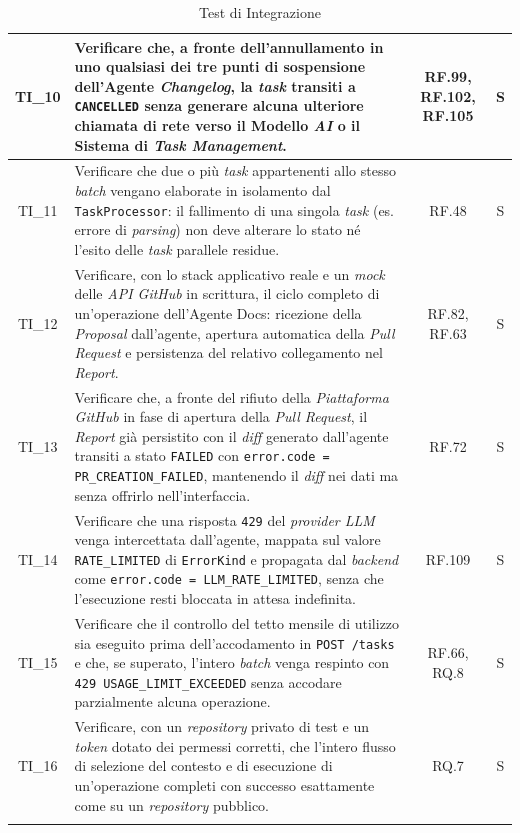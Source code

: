 \documentclass[12pt, a4paper]{article}
\newlength{\LargColVal} %
\begin{document}
\begin{xltabular}{\textwidth}{|c|X|C{\LargColVal}|C{\LargColVal}|}
    TI\_10 & Verificare che, a fronte dell'annullamento in uno qualsiasi dei tre punti di sospensione dell'Agente \textit{Changelog}, la \textit{task} transiti a \texttt{CANCELLED} senza generare alcuna ulteriore chiamata di rete verso il Modello \textit{AI} o il Sistema di \textit{Task Management}. & RF.99, RF.102, RF.105 & S \\ \hline

    TI\_11 & Verificare che due o più \textit{task} appartenenti allo stesso \textit{batch} vengano elaborate in isolamento dal \texttt{TaskProcessor}: il fallimento di una singola \textit{task} (es. errore di \textit{parsing}) non deve alterare lo stato né l'esito delle \textit{task} parallele residue. & RF.48 & S \\ \hline

    TI\_12 & Verificare, con lo stack applicativo reale e un \textit{mock} delle \textit{API GitHub} in scrittura, il ciclo completo di un'operazione dell'Agente Docs: ricezione della \textit{Proposal} dall'agente, apertura automatica della \textit{Pull Request} e persistenza del relativo collegamento nel \textit{Report}. & RF.82, RF.63 & S \\ \hline

    TI\_13 & Verificare che, a fronte del rifiuto della \textit{Piattaforma GitHub} in fase di apertura della \textit{Pull Request}, il \textit{Report} già persistito con il \textit{diff} generato dall'agente transiti a stato \texttt{FAILED} con \texttt{error.code = PR\_CREATION\_FAILED}, mantenendo il \textit{diff} nei dati ma senza offrirlo nell'interfaccia. & RF.72 & S \\ \hline

    TI\_14 & Verificare che una risposta \texttt{429} del \textit{provider LLM} venga intercettata dall'agente, mappata sul valore \texttt{RATE\_LIMITED} di \texttt{ErrorKind} e propagata dal \textit{backend} come \texttt{error.code = LLM\_RATE\_LIMITED}, senza che l'esecuzione resti bloccata in attesa indefinita. & RF.109 & S \\ \hline

    TI\_15 & Verificare che il controllo del tetto mensile di utilizzo sia eseguito prima dell'accodamento in \texttt{POST /tasks} e che, se superato, l'intero \textit{batch} venga respinto con \texttt{429 USAGE\_LIMIT\_EXCEEDED} senza accodare parzialmente alcuna operazione. & RF.66, RQ.8 & S \\ \hline

    TI\_16 & Verificare, con un \textit{repository} privato di test e un \textit{token} dotato dei permessi corretti, che l'intero flusso di selezione del contesto e di esecuzione di un'operazione completi con successo esattamente come su un \textit{repository} pubblico. & RQ.7 & S \\ \hline



    \caption{Test di Integrazione}
    \label{tab:test_integrazione}
\end{xltabular}
\end{document}
